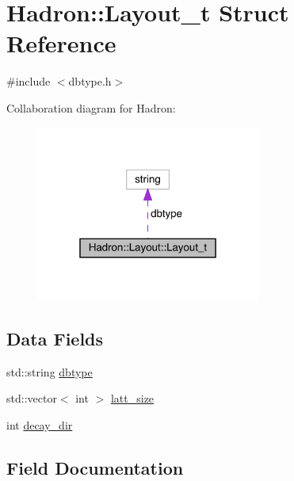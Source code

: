 \hypertarget{structHadron_1_1Layout_1_1Layout__t}{}\section{Hadron\+:\+:Layout\+\_\+t Struct Reference}
\label{structHadron_1_1Layout_1_1Layout__t}


{\ttfamily \#include $<$dbtype.\+h$>$}



Collaboration diagram for Hadron\+:\nopagebreak
\begin{figure}[H]
\begin{center}
\leavevmode
\includegraphics[width=208pt]{d9/d1f/structHadron_1_1Layout_1_1Layout__t__coll__graph}
\end{center}
\end{figure}
\subsection*{Data Fields}
\begin{DoxyCompactItemize}
\item 
std\+::string \mbox{\hyperlink{structHadron_1_1Layout_1_1Layout__t_a71d86f89312b6a84c1c470119494022e}{dbtype}}
\item 
std\+::vector$<$ int $>$ \mbox{\hyperlink{structHadron_1_1Layout_1_1Layout__t_af7148e38cf735a902e10e5d1baa09163}{latt\+\_\+size}}
\item 
int \mbox{\hyperlink{structHadron_1_1Layout_1_1Layout__t_aeb89b410154551d4dade862bf5a55955}{decay\+\_\+dir}}
\end{DoxyCompactItemize}


\subsection{Field Documentation}
\mbox{\label{structHadron_1_1Layout_1_1Layout__t_a71d86f89312b6a84c1c470119494022e}} 
